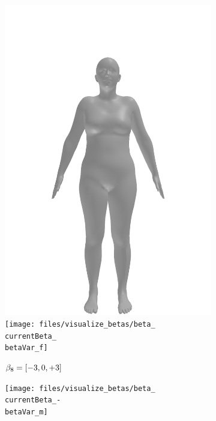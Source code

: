 \begin{figure}[ht!]
\begin{subfigure}{\betaWidth}
        \includegraphics[width=\imgWidth]{files/visualize_betas/baseline_f}
        \texttt{[image: files/visualize\_betas/beta\_\\currentBeta\_\\betaVar\_f]}
        \caption{$\beta_8 = [-3, 0, +3]$}
    \end{subfigure}
    \begin{subfigure}{\betaWidth}
        \def\currentBeta{8}
        \centering
        \texttt{[image: files/visualize\_betas/beta\_\\currentBeta\_-\\betaVar\_m]}

\end{subfigure}
\end{figure}
